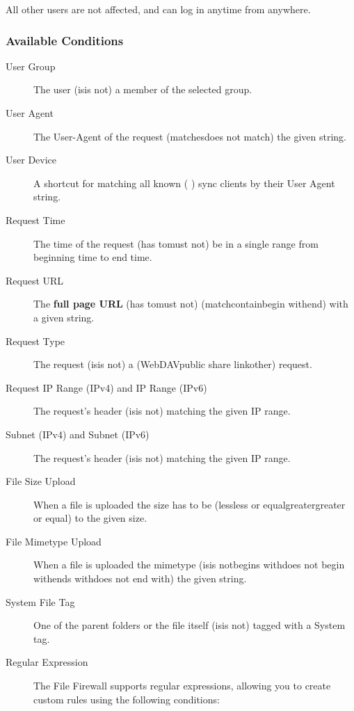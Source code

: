 \documentclass[letterpaper,10pt,english]{sphinxmanual}
\begin{document}
All other users are not affected, and can log in anytime from anywhere.


\subsubsection{Available Conditions}
\label{enterprise_firewall/file_firewall:available-conditions}\begin{description}
\item[{User Group}] \leavevmode
The user (is\textbar{}is not) a member of the selected group.

\item[{User Agent}] \leavevmode
The User-Agent of the request (matches\textbar{}does not match) the given string.

\item[{User Device}] \leavevmode
A shortcut for matching all known ( \textbar{}  \textbar{} ) sync clients by
their User Agent string.

\item[{Request Time}] \leavevmode
The time of the request (has to\textbar{}must not) be in a single range from beginning
time to end time.

\item[{Request URL}] \leavevmode
The \textbf{full page URL} (has to\textbar{}must not) (match\textbar{}contain\textbar{}begin with\textbar{}end) with a
given string.

\item[{Request Type}] \leavevmode
The request (is\textbar{}is not) a (WebDAV\textbar{}public share link\textbar{}other) request.

\item[{Request IP Range (IPv4) and IP Range (IPv6)}] \leavevmode
The request's  header (is\textbar{}is not) matching the given IP range.

\item[{Subnet (IPv4) and Subnet (IPv6)}] \leavevmode
The request's  header (is\textbar{}is not) matching the given IP range.

\item[{File Size Upload}] \leavevmode
When a file is uploaded the size has to be (less\textbar{}less or equal\textbar{}greater\textbar{}greater
or equal) to the given size.

\item[{File Mimetype Upload}] \leavevmode
When a file is uploaded the mimetype (is\textbar{}is not\textbar{}begins with\textbar{}does not begin
with\textbar{}ends with\textbar{}does not end with) the given string.

\item[{System File Tag}] \leavevmode
One of the parent folders or the file itself (is\textbar{}is not) tagged with a System
tag.

\item[{Regular Expression}] \leavevmode
The File Firewall supports regular expressions, allowing you to create custom
rules using the following conditions:

\end{description}
\end{document}
